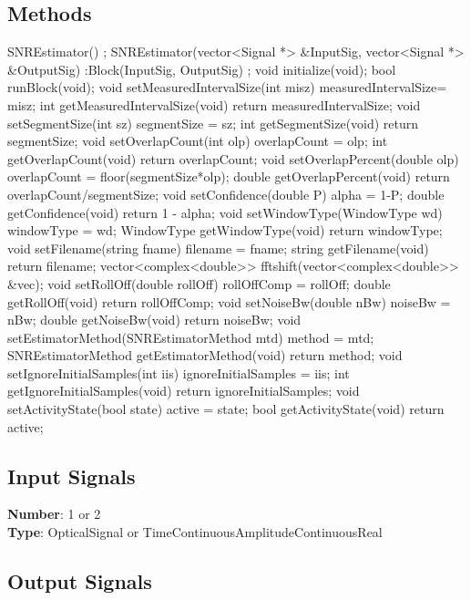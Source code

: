 \begin{refsection}
\subsection*{Methods}
	SNREstimator() {};
	\bigbreak
	SNREstimator(vector<Signal *> \&InputSig, vector<Signal *> \&OutputSig) 
	:Block(InputSig, OutputSig) {};
	\bigbreak
	void initialize(void);
	\bigbreak
	bool runBlock(void);
	\bigbreak
	void setMeasuredIntervalSize(int misz) { measuredIntervalSize= misz; }
	\bigbreak
	int getMeasuredIntervalSize(void) { return measuredIntervalSize; }
	\bigbreak
	void setSegmentSize(int sz) { segmentSize = sz; }
	\bigbreak
	int getSegmentSize(void) { return segmentSize; }
	\bigbreak
	void setOverlapCount(int olp) { overlapCount = olp; }
	\bigbreak
	int getOverlapCount(void) { return overlapCount; }
	\bigbreak
	void setOverlapPercent(double olp) { overlapCount = floor(segmentSize*olp); }
	\bigbreak
	double getOverlapPercent(void) { return overlapCount/segmentSize; }
	\bigbreak
	void setConfidence(double P) { alpha = 1-P; }
	\bigbreak
	double getConfidence(void) { return 1 - alpha; }
	\bigbreak
	void setWindowType(WindowType wd) { windowType = wd; }
	\bigbreak
	WindowType getWindowType(void) { return windowType; }
	\bigbreak
	void setFilename(string fname) { filename = fname; }
	\bigbreak
	string getFilename(void) { return filename; }
	\bigbreak
	vector<complex<double>> fftshift(vector<complex<double>> \&vec);
	\bigbreak
	void setRollOff(double rollOff) { rollOffComp = rollOff; }
	\bigbreak
	double getRollOff(void) { return rollOffComp; }
	\bigbreak
	void setNoiseBw(double nBw) {  noiseBw = nBw; }
	\bigbreak
	double getNoiseBw(void) { return noiseBw; }
	\bigbreak
	void setEstimatorMethod(SNREstimatorMethod mtd) { method = mtd; }
	\bigbreak
	SNREstimatorMethod getEstimatorMethod(void) { return method; }
	\bigbreak
	void setIgnoreInitialSamples(int iis) { ignoreInitialSamples = iis; }
	\bigbreak
	int getIgnoreInitialSamples(void) { return ignoreInitialSamples; }
	\bigbreak
	void setActivityState(bool state) { active = state; }
	\bigbreak
	bool getActivityState(void) { return active; }
	\bigbreak

\subsection*{Input Signals}

\textbf{Number}: 1 or 2\\
\textbf{Type}: OpticalSignal or TimeContinuousAmplitudeContinuousReal

\subsection*{Output Signals}


\end{refsection}
